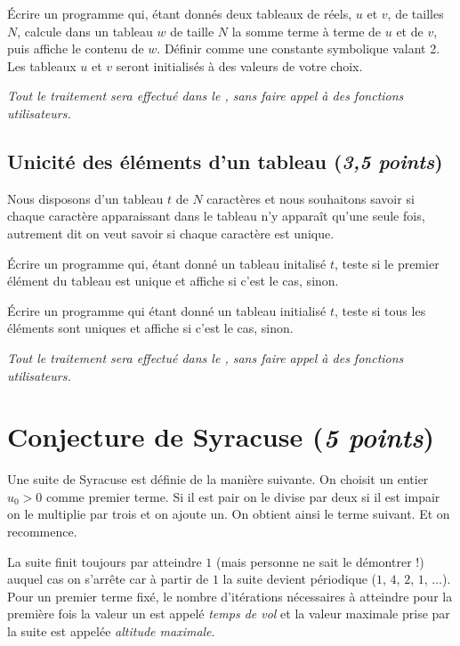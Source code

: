 Écrire un programme qui, étant donnés deux tableaux de réels, $u$ et
$v$, de tailles $N$, calcule dans un tableau $w$ de taille $N$ la somme
terme à terme de $u$ et de $v$, puis affiche le contenu de $w$. Définir
 comme une constante symbolique valant 2. Les tableaux $u$ et $v$
seront initialisés à des valeurs de votre choix. 

\emph{Tout le traitement sera effectué dans le , sans faire
  appel à des fonctions utilisateurs.}



\subsection{Unicité des éléments d'un tableau (\emph{3,5 points})}

Nous disposons d'un tableau $t$ de $N$ caractères et nous souhaitons
savoir si chaque caractère apparaissant dans le tableau n'y apparaît
qu'une seule fois, autrement dit on veut savoir si chaque caractère
est unique.

\begin{newenu}
\item Écrire un programme qui, étant donné un tableau initalisé $t$,
  teste si le premier élément du tableau est unique et affiche
   si c'est le cas,  sinon.

\item  Écrire un programme qui étant donné un tableau initialisé $t$, teste
  si tous les éléments sont uniques et affiche  si c'est le
  cas,  sinon.
\end{newenu}

\emph{Tout le traitement
sera effectué dans le , sans faire appel à des fonctions
utilisateurs.}

\section{Conjecture de Syracuse (\emph{5 points})}

Une suite de Syracuse est définie de la manière suivante. On choisit
un entier $u_0 > 0$ comme premier terme. Si il est pair on le divise
par deux si il est impair on le multiplie par trois et on ajoute un. On
obtient ainsi le terme suivant. Et on recommence. 

La suite finit toujours par atteindre $1$ (mais personne ne sait le
démontrer !)  auquel cas on s'arrête car à partir de $1$ la suite
devient périodique ($1$, $4$, $2$, $1$, $\ldots$).  Pour un premier
terme fixé, le nombre d'itérations nécessaires à atteindre pour la
première fois la valeur un est appelé \emph{temps de vol} et la valeur
maximale prise par la suite est appelée \emph{altitude maximale}.

